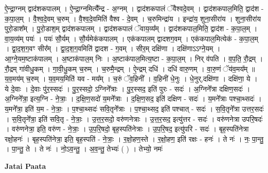 \documentclass[17pt]{extarticle}
\begin{document}
ऐ॒न्द्रा॒ग्नम् द्वाद॑शकपालम् । ऐ॒न्द्रा॒ग्नमित्यै᳚न्द्र - अ॒ग्नम् । द्वाद॑शकपालं ॅवैश्वदे॒वम् । द्वाद॑शकपाल॒मिति॒ द्वाद॑श - क॒पा॒ल॒म् । वै॒श्व॒दे॒वम् च॒रुम् । वै॒श्व॒दे॒वमिति॑ वैश्व - दे॒वम् । च॒रुमिन्द्रा॑य । इन्द्रा॑य॒ शुना॒सीरा॑य । शुना॒सीरा॑य पुरो॒डाश᳚म् । पु॒रो॒डाश॒म् द्वाद॑शकपालम् । द्वाद॑शकपालं ॅवाय॒व्य᳚म् । द्वाद॑शकपाल॒मिति॒ द्वाद॑श - क॒पा॒ल॒म् । वा॒य॒व्य॑म् पयः॑ । पयः॑ सौ॒र्यम् । सौ॒र्यमेक॑कपालम् । एक॑कपालम् द्वादशग॒वम् । एक॑कपाल॒मित्येक॑ - क॒पा॒ल॒म् । द्वा॒द॒श॒ग॒वꣳ सीर᳚म् । द्वा॒द॒श॒ग॒वमिति॑ द्वादश - ग॒वम् । सीर॒म् दक्षि॑णा । दक्षि॑णाऽऽग्ने॒यम् । आ॒ग्ने॒यम॒ष्टाक॑पालम् । अ॒ष्टाक॑पाल॒म् निः । अ॒ष्टाक॑पाल॒मित्य॒ष्टा - क॒पा॒ल॒म् । निर् व॑पति । व॒प॒ति॒ रौ॒द्रम् । रौ॒द्रम् गा॑वीधु॒कम् । गा॒वी॒धु॒कम् च॒रुम् । च॒रुमै॒न्द्रम् । ऐ॒न्द्रम् दधि॑ । दधि॑ वारु॒णम् । वा॒रु॒णं ॅय॑व॒मय᳚म् ॥ य॒व॒मय॑म् च॒रुम् । य॒व॒मय॒मिति॑ यव - मय᳚म् । च॒रुं ॅव॒हिनी᳚ । व॒हिनी॑ धे॒नुः । धे॒नुर्,दक्षि॑णा । दक्षि॑णा॒ ये । ये दे॒वाः । दे॒वाः पु॑र॒स्सदः॑ । पु॒र॒स्सदो॒ ऽग्निने᳚त्राः । पु॒र॒स्सद॒ इति॑ पुरः - सदः॑ । अ॒ग्निने᳚त्रा दक्षिण॒सदः॑ । अ॒ग्निने᳚त्रा॒ इत्य॒ग्नि - ने॒त्राः॒ । द॒क्षि॒ण॒सदो॑ य॒मने᳚त्राः । द॒क्षि॒ण॒सद॒ इति॑ दक्षिण - सदः॑ । य॒मने᳚त्राः पश्चा॒थ्सदः॑ । य॒मने᳚त्रा॒ इति॑ य॒म - ने॒त्राः॒ । प॒श्चा॒थ्सदः॑ सवि॒तृने᳚त्राः । प॒श्चा॒थ्सद॒ इति॑ पश्चात् - सदः॑ । स॒वि॒तृने᳚त्रा उत्तर॒सदः॑ । स॒वि॒तृने᳚त्रा॒ इति॑ सवि॒तृ - ने॒त्राः॒ । उ॒त्त॒र॒सदो॒ वरु॑णनेत्राः । उ॒त्त॒र॒सद॒ इत्यु॑त्तर - सदः॑ । वरु॑णनेत्रा उपरि॒षदः॑ । वरु॑णनेत्रा॒ इति॒ वरु॑ण - ने॒त्राः॒ । उ॒प॒रि॒षदो॒ बृह॒स्पति॑नेत्राः । उ॒प॒रि॒षद॒ इत्यु॑परि - सदः॑ । बृह॒स्पति॑नेत्रा रक्षो॒हनः॑ । बृह॒स्पति॑नेत्रा॒ इति॒ बृह॒स्पति॑ - ने॒त्राः॒ । र॒क्षो॒हण॒स्ते । र॒क्षो॒हण॒ इति॑ रक्षः - हनः॑ । ते नः॑ । नः॒ पा॒न्तु॒ । पा॒न्तु॒ ते । ते नः॑ । नो॒ऽव॒न्तु॒ । अ॒व॒न्तु॒ तेभ्यः॑ ( ) । तेभ्यो॒ नमः॑ \newline

\textbf{Jatai Paata} \newline
\end{document}
